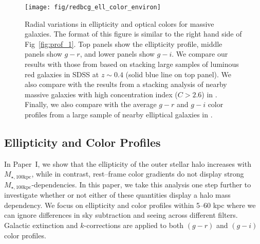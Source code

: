 \documentclass[a4paper,fleqn,usenatbib]{mnras}
\def\mstar{{$M_{\star}$}}
\def\mtot{{$M_{\star,100\mathrm{kpc}}$}}
\def\mden{{$\mu_{\star}$}}
\begin{document}
     

  \begin{figure}
      \centering 
      \texttt{[image: fig/redbcg\_ell\_color\_environ]}
      \caption{
          Radial variations in ellipticity and optical colors for massive galaxies. 
          The format of this figure is similar to the right hand side of 
          Fig~\ref{fig:prof_1}. 
          Top panels show the ellipticity profile, middle panels show $g-r$, and lower 
          panels show $g-i$. 
          We compare our results with those from \citet{Tal2011} based on stacking 
          large samples of luminous red galaxies in SDSS at $z{\sim} 0.4$ 
          (solid blue line on top panel). 
          We also compare with the results from a stacking analysis of nearby massive 
          galaxies with high concentration index ($C>2.6$) in 
          \citet[][blue dash lines on the top and middle panels]{DSouza2014}. 
          Finally, we also compare with the average $g-r$ and $g-i$ color profiles 
          from a large sample of nearby elliptical galaxies in \citet[][blue, solid 
          lines on the middle and bottom panels]{LaBarbera2010}.
          }
      \label{fig:ell_color}
  \end{figure}


\subsection{Ellipticity and Color Profiles}
    \label{ssec:ell_color}
    
    In Paper~I, we show that the ellipticity of the outer stellar halo increases with
    \mtot{}, while in contrast, rest--frame color gradients do not display strong 
    \mtot{}-dependencies. 
    In this paper, we take this analysis one step further to investigate whether or 
    not either of these quantities display a halo mass dependency. 
    We focus on ellipticity and color profiles within 5--60 kpc where we can ignore
    differences in sky subtraction and seeing across different filters. 
    Galactic extinction and $k$-corrections are applied to both $(g-r)$ and $(g-i)$ 
    color profiles.
    
\end{document}
